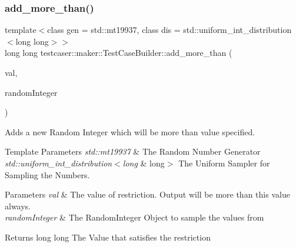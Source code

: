 \subsubsection{\texorpdfstring{add\+\_\+more\+\_\+than()}{add\_more\_than()}\hspace{0.1cm}{\footnotesize\ttfamily [1/2]}}
{\footnotesize\ttfamily template$<$class gen  = std\+::mt19937, class dis  = std\+::uniform\+\_\+int\+\_\+distribution$<$long long$>$$>$ \\
long long testcaser\+::maker\+::\+Test\+Case\+Builder\+::add\+\_\+more\+\_\+than (\begin{DoxyParamCaption}\item[{long long}]{val,  }\item[{\hyperlink{classtestcaser_1_1maker_1_1types_1_1RandomInteger}{types\+::\+Random\+Integer}$<$ gen, dis $>$ \&}]{random\+Integer }\end{DoxyParamCaption})\hspace{0.3cm}{\ttfamily [inline]}}



Adds a new Random Integer which will be more than value specified. 


\begin{DoxyTemplParams}{Template Parameters}
{\em std\+::mt19937} & The Random Number Generator \\
\hline
{\em std\+::uniform\+\_\+int\+\_\+distribution$<$long} & long$>$ The Uniform Sampler for Sampling the Numbers. \\
\hline
\end{DoxyTemplParams}

\begin{DoxyParams}{Parameters}
{\em val} & The value of restriction. Output will be more than this value always. \\
\hline
{\em random\+Integer} & The Random\+Integer Object to sample the values from \\
\hline
\end{DoxyParams}
\begin{DoxyReturn}{Returns}
long long The Value that satisfies the restriction 
\end{DoxyReturn}
\mbox{\label{classtestcaser_1_1maker_1_1TestCaseBuilder_a00745e4a312209178432e06d4c9aae08}} 
